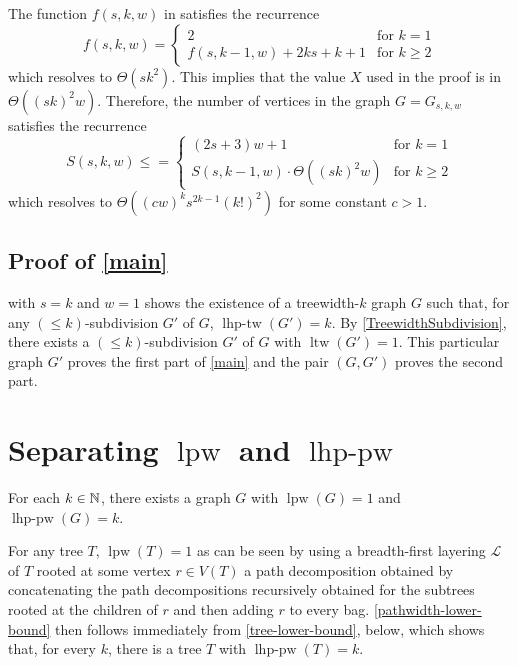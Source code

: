 \documentclass[kpfonts]{patmorin}
\DeclareMathOperator{\ltw}{ltw}
\DeclareMathOperator{\lpw}{lpw}
\DeclareMathOperator{\lhptw}{lhp-tw}
\DeclareMathOperator{\lhppw}{lhp-pw}
\begin{document}
\begin{rem}
    The function $f(s,k,w)$ in  satisfies the recurrence
    \[  f(s,k,w)
        = \begin{cases}
            2 & \text{for $k=1$} \\
            f(s,k-1,w) + 2ks +k+ 1 & \text{for $k\ge 2$}
        \end{cases}
    \]
    which resolves to $\Theta(sk^2)$.  This implies that the value $X$ used in the proof is in $\Theta((sk)^2w)$.  Therefore, the number of vertices in the graph $G=G_{s,k,w}$ satisfies the recurrence
    \[  S(s,k,w) \le
        = \begin{cases}
            (2s+3)w+1 & \text{for $k=1$} \\
            S(s,k-1,w) \cdot \Theta((sk)^2 w) & \text{for $k\ge 2$}
        \end{cases}
    \]
    which resolves to $\Theta((cw)^{k}s^{2k-1}(k!)^2)$ for some constant $c>1$.
\end{rem}


\subsection{Proof of \cref{main}}

 with $s=k$ and $w=1$ shows the existence of a treewidth-$k$ graph $G$ such that, for any $(\le\!\!k)$-subdivision $G'$ of $G$, $\lhptw(G')=k$.  By \cref{TreewidthSubdivision}, there exists a $(\le\!\!k)$-subdivision $G'$ of $G$ with $\ltw(G')=1$.  This particular graph $G'$ proves the first part of \cref{main} and the pair $(G,G')$ proves the second part.

\section{Separating $\lpw$ and $\lhppw$}

\begin{thm}\label{pathwidth-lower-bound}
    For each $k\in\mathbb{N}$, there exists a graph $G$ with $\lpw(G)=1$ and $\lhppw(G)=k$.
\end{thm}

For any tree $T$, $\lpw(T)=1$ as can be seen by using a breadth-first layering $\mathcal{L}$ of $T$ rooted at some vertex $r\in V(T)$ a path decomposition obtained by concatenating the path decompositions recursively obtained for the subtrees rooted at the children of $r$ and then adding $r$ to every bag.  \cref{pathwidth-lower-bound} then follows immediately from \cref{tree-lower-bound}, below, which shows that, for every $k$, there is a tree $T$ with $\lhppw(T)=k$.
\end{document}
